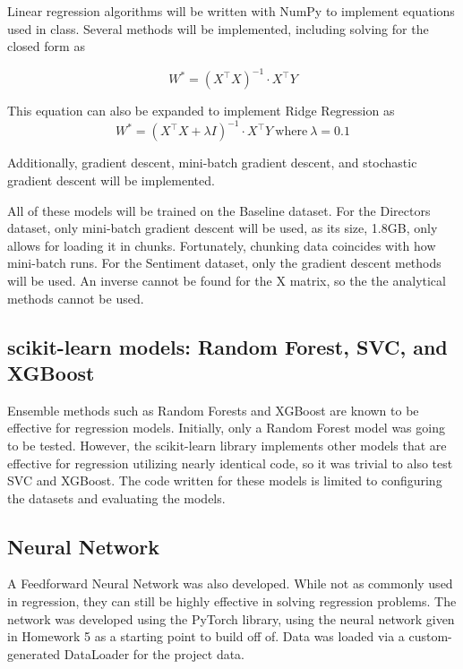 \documentclass[11pt,letterpaper,oneside,titlepage]{article}
\begin{document}
Linear regression algorithms will be written with NumPy to implement equations used in class. Several methods will be implemented, including solving for the closed form as

\begin{equation}
    W^* = (X^{\top}X)^{-1}\cdot X^{\top}Y
\end{equation}

This equation can also be expanded to implement Ridge Regression as
\begin{equation}
    W^* = (X^{\top}X + \lambda I)^{-1}\cdot X^{\top}Y\ \text{where}\ \lambda=0.1
\end{equation}

Additionally, gradient descent, mini-batch gradient descent, and stochastic gradient descent will be implemented.

All of these models will be trained on the Baseline dataset. For the Directors dataset, only mini-batch gradient descent will be used, as its size, 1.8GB, only allows for loading it in chunks. Fortunately, chunking data coincides with how mini-batch runs. For the Sentiment dataset, only the gradient descent methods will be used. An inverse cannot be found for the X matrix, so the the analytical methods cannot be used.

\subsection{scikit-learn models: Random Forest, SVC, and XGBoost}

Ensemble methods such as Random Forests and XGBoost are known to be effective for regression models\cite{Keboola_2020}\cite{Snowflake}\cite{mccurciomccurcio}. Initially, only a Random Forest model was going to be tested. However, the scikit-learn library implements other models that are effective for regression utilizing nearly identical code, so it was trivial to also test SVC and XGBoost. The code written for these models is limited to configuring the datasets and evaluating the models.


\subsection{Neural Network}

A Feedforward Neural Network was also developed. While not as commonly used in regression, they can still be highly effective in solving regression problems. The network was developed using the PyTorch library, using the neural network given in Homework 5 as a starting point to build off of. Data was loaded via a custom-generated DataLoader for the project data.
\end{document}
